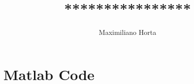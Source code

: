 \documentclass[12pt,a4paper,norsk]{article}
\begin{document}
\title{****************}
\author{Maximiliano Horta}

\maketitle

\newpage

\section*{Matlab Code}


\end{document}
